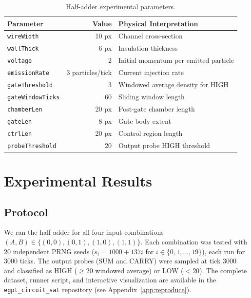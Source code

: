 \documentclass[11pt,a4paper]{article}
\begin{document}
\begin{table}[H]
\centering
\begin{tabular}{lrl}
\toprule
\textbf{Parameter} & \textbf{Value} & \textbf{Physical Interpretation} \\
\midrule
\texttt{wireWidth} & 10 px & Channel cross-section \\
\texttt{wallThick} & 6 px & Insulation thickness \\
\texttt{voltage} & 2 & Initial momentum per emitted particle \\
\texttt{emissionRate} & 3 particles/tick & Current injection rate \\
\texttt{gateThreshold} & 3 & Windowed average density for HIGH \\
\texttt{gateWindowTicks} & 60 & Sliding window length \\
\texttt{chamberLen} & 20 px & Post-gate chamber length \\
\texttt{gateLen} & 8 px & Gate body extent \\
\texttt{ctrlLen} & 20 px & Control region length \\
\texttt{probeThreshold} & 20 & Output probe HIGH threshold \\
\bottomrule
\end{tabular}
\caption{Half-adder experimental parameters.}
\label{tab:params}
\end{table}


\section{Experimental Results}
\label{sec:results}

\subsection{Protocol}

We ran the half-adder for all four input combinations $(A, B) \in \{(0,0), (0,1), (1,0), (1,1)\}$. Each combination was tested with 20 independent PRNG seeds ($s_i = 1000 + 137i$ for $i \in \{0, 1, \ldots, 19\}$), each run for 3000 ticks. The output probes (SUM and CARRY) were sampled at tick 3000 and classified as HIGH ($\geq 20$ windowed average) or LOW ($< 20$). The complete dataset, runner script, and interactive visualization are available in the \texttt{egpt\_circuit\_sat} repository (see Appendix~\ref{app:reproduce}).
\end{document}
